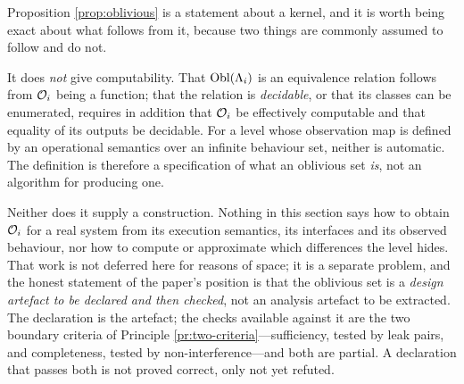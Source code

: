 \begin{remark}\label{rmk:kernel-limits}
Proposition \ref{prop:oblivious} is a statement about a kernel, and it is worth being exact about
what follows from it, because two things are commonly assumed to follow and do not.

It does \emph{not} give computability. That $\operatorname{Obl}(\Lambda_i)$ is an equivalence relation follows from
$\mathcal{O}_i$ being a function; that the relation is \emph{decidable}, or that its classes can be
enumerated, requires in addition that $\mathcal{O}_i$ be effectively computable and that equality of its
outputs be decidable. For a level whose observation map is defined by an operational semantics over an
infinite behaviour set, neither is automatic. The definition is therefore a specification of what an
oblivious set \emph{is}, not an algorithm for producing one.

Neither does it supply a construction. Nothing in this section says how to obtain $\mathcal{O}_i$ for a real
system from its execution semantics, its interfaces and its observed behaviour, nor how to compute or
approximate which differences the level hides. That work is not deferred here for reasons of space; it
is a separate problem, and the honest statement of the paper's position is that the oblivious set is a
\emph{design artefact to be declared and then checked}, not an analysis artefact to be extracted. The
declaration is the artefact; the checks available against it are the two boundary criteria of
Principle \ref{pr:two-criteria}---sufficiency, tested by leak pairs, and completeness, tested by
non-interference---and both are partial. A declaration that passes both is not proved correct, only
not yet refuted.
\end{remark}

